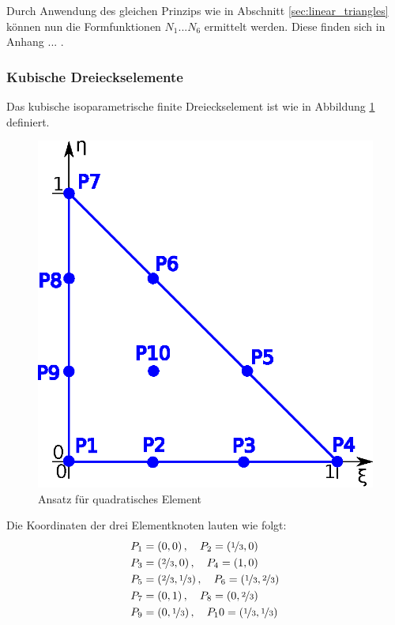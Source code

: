Durch Anwendung des gleichen Prinzips wie in Abschnitt \ref{sec:linear_triangles} können nun die Formfunktionen $N_1 \text{...} N_6$ ermittelt werden. Diese finden sich in Anhang ... .





\subsubsection{Kubische Dreieckselemente}

Das kubische isoparametrische finite Dreieckselement ist wie in Abbildung \ref{fig:cubic_element} definiert.

\begin{figure}
	\vspace{-6cm}
	\begin{center}
		\includegraphics[scale=0.65]{pics/cubic_element.eps}
	\end{center}
	\caption{Ansatz für quadratisches Element}
	\label{fig:cubic_element}
\end{figure}

Die Koordinaten der drei Elementknoten lauten wie folgt:
\begin{align}
&P_1 = \left(0, 0 \right), \quad P_2 = \left(\nicefrac{1}{3}, 0 \right)\\
&P_3 = \left(\nicefrac{2}{3}, 0 \right), \quad P_4 = \left(1, 0 \right) \nonumber \\
&P_5 = \left(\nicefrac{2}{3}, \nicefrac{1}{3} \right), \quad P_6 = \left(\nicefrac{1}{3}, \nicefrac{2}{3} \right) \nonumber\\
&P_7 = \left(0, 1 \right), \quad P_8 = \left(0, \nicefrac{2}{3} \right) \nonumber \\
&P_9 = \left(0, \nicefrac{1}{3} \right), \quad P_10 = \left(\nicefrac{1}{3}, \nicefrac{1}{3} \right) \nonumber\\
\end{align}

